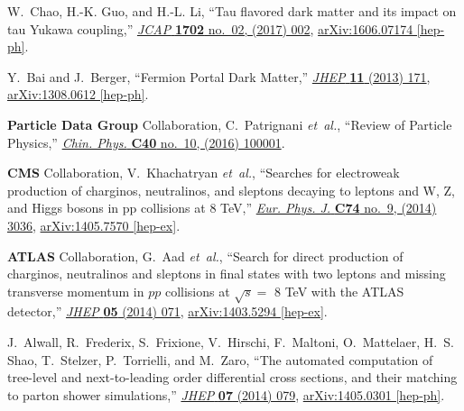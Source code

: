 \documentclass[aps,prd,letterpaper,showpacs,twocolumn,preprintnumbers,floatfix,superscriptaddress]{revtex4-1}
\begin{document}
\begin{thebibliography}{99}
W.~Chao, H.-K. Guo, and H.-L. Li, ``{Tau flavored dark matter and its impact on
  tau Yukawa coupling},''
  \href{http://dx.doi.org/10.1088/1475-7516/2017/02/002}{{\em JCAP} {\bfseries
  1702} no.~02, (2017) 002},
\href{http://arxiv.org/abs/1606.07174}{{\ttfamily arXiv:1606.07174 [hep-ph]}}.

Y.~Bai and J.~Berger, ``{Fermion Portal Dark Matter},''
  \href{http://dx.doi.org/10.1007/JHEP11(2013)171}{{\em JHEP} {\bfseries 11}
  (2013) 171},
\href{http://arxiv.org/abs/1308.0612}{{\ttfamily arXiv:1308.0612 [hep-ph]}}.

{\bfseries Particle Data Group} Collaboration, C.~Patrignani {\em et~al.},
  ``{Review of Particle Physics},''
\href{http://dx.doi.org/10.1088/1674-1137/40/10/100001}{{\em Chin. Phys.}
  {\bfseries C40} no.~10, (2016) 100001}.

{\bfseries CMS} Collaboration, V.~Khachatryan {\em et~al.}, ``{Searches for
  electroweak production of charginos, neutralinos, and sleptons decaying to
  leptons and W, Z, and Higgs bosons in pp collisions at 8 TeV},''
  \href{http://dx.doi.org/10.1140/epjc/s10052-014-3036-7}{{\em Eur. Phys. J.}
  {\bfseries C74} no.~9, (2014) 3036},
\href{http://arxiv.org/abs/1405.7570}{{\ttfamily arXiv:1405.7570 [hep-ex]}}.

{\bfseries ATLAS} Collaboration, G.~Aad {\em et~al.}, ``{Search for direct
  production of charginos, neutralinos and sleptons in final states with two
  leptons and missing transverse momentum in $pp$ collisions at $\sqrt{s} =$ 8
  TeV with the ATLAS detector},''
  \href{http://dx.doi.org/10.1007/JHEP05(2014)071}{{\em JHEP} {\bfseries 05}
  (2014) 071},
\href{http://arxiv.org/abs/1403.5294}{{\ttfamily arXiv:1403.5294 [hep-ex]}}.

J.~Alwall, R.~Frederix, S.~Frixione, V.~Hirschi, F.~Maltoni, O.~Mattelaer,
  H.~S. Shao, T.~Stelzer, P.~Torrielli, and M.~Zaro, ``{The automated
  computation of tree-level and next-to-leading order differential cross
  sections, and their matching to parton shower simulations},''
  \href{http://dx.doi.org/10.1007/JHEP07(2014)079}{{\em JHEP} {\bfseries 07}
  (2014) 079},
\href{http://arxiv.org/abs/1405.0301}{{\ttfamily arXiv:1405.0301 [hep-ph]}}.


\end{thebibliography}
\end{document}
